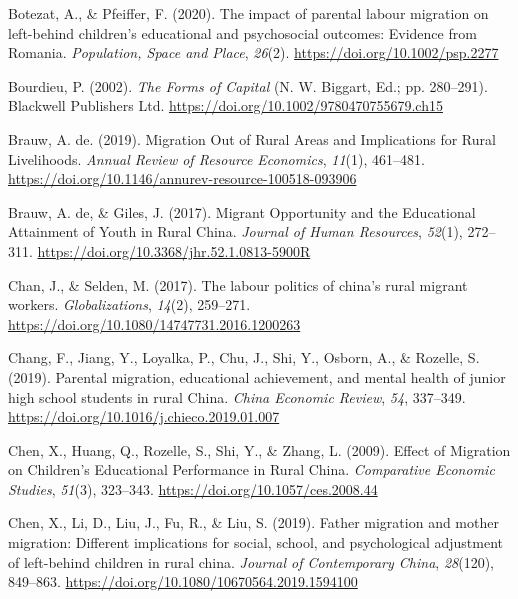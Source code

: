 \documentclass[
  man,floatsintext]{apa7}
\newlength{\cslhangindent}
\newlength{\cslentryspacingunit} %
\newenvironment{CSLReferences}[2] %
 {%
  \setlength{\parindent}{0pt}
  \ifodd #1
  \let\oldpar\par
  \def\par{\hangindent=\cslhangindent\oldpar}
  \fi
  \setlength{\parskip}{#2\cslentryspacingunit}
 }%
 {}
\begin{document}
\begin{CSLReferences}{1}{0}
\leavevmode{}%
Botezat, A., \& Pfeiffer, F. (2020). The impact of parental labour migration on left{-}behind children's educational and psychosocial outcomes: Evidence from Romania. \emph{Population, Space and Place}, \emph{26}(2). \url{https://doi.org/10.1002/psp.2277}

\leavevmode{}%
Bourdieu, P. (2002). \emph{The Forms of Capital} (N. W. Biggart, Ed.; pp. 280--291). Blackwell Publishers Ltd. \url{https://doi.org/10.1002/9780470755679.ch15}

\leavevmode{}%
Brauw, A. de. (2019). Migration Out of Rural Areas and Implications for Rural Livelihoods. \emph{Annual Review of Resource Economics}, \emph{11}(1), 461--481. \url{https://doi.org/10.1146/annurev-resource-100518-093906}

\leavevmode{}%
Brauw, A. de, \& Giles, J. (2017). Migrant Opportunity and the Educational Attainment of Youth in Rural China. \emph{Journal of Human Resources}, \emph{52}(1), 272--311. \url{https://doi.org/10.3368/jhr.52.1.0813-5900R}

\leavevmode{}%
Chan, J., \& Selden, M. (2017). The labour politics of china{'}s rural migrant workers. \emph{Globalizations}, \emph{14}(2), 259--271. \url{https://doi.org/10.1080/14747731.2016.1200263}

\leavevmode{}%
Chang, F., Jiang, Y., Loyalka, P., Chu, J., Shi, Y., Osborn, A., \& Rozelle, S. (2019). Parental migration, educational achievement, and mental health of junior high school students in rural China. \emph{China Economic Review}, \emph{54}, 337--349. \url{https://doi.org/10.1016/j.chieco.2019.01.007}

\leavevmode{}%
Chen, X., Huang, Q., Rozelle, S., Shi, Y., \& Zhang, L. (2009). Effect of Migration on Children's Educational Performance in Rural China. \emph{Comparative Economic Studies}, \emph{51}(3), 323--343. \url{https://doi.org/10.1057/ces.2008.44}

\leavevmode{}%
Chen, X., Li, D., Liu, J., Fu, R., \& Liu, S. (2019). Father migration and mother migration: Different implications for social, school, and psychological adjustment of left-behind children in rural china. \emph{Journal of Contemporary China}, \emph{28}(120), 849--863. \url{https://doi.org/10.1080/10670564.2019.1594100}


\end{CSLReferences}
\end{document}
